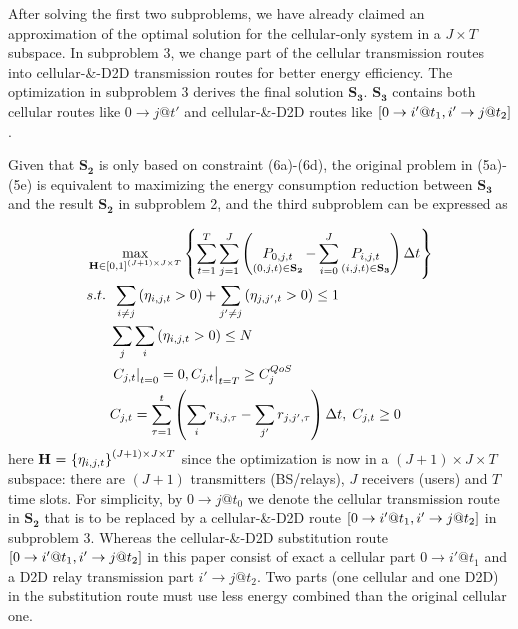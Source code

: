 \documentclass{ieeeaccess}
\begin{document}
After solving the first two subproblems, we have already claimed an approximation of the optimal solution for the cellular-only system in a $J \times T$ subspace. In subproblem 3, we change part of the cellular transmission routes into cellular-\&-D2D transmission routes for better energy efficiency. The optimization in subproblem 3 derives the final solution ${{\mathbf{S}}_{\mathbf{3}}}$. ${{\mathbf{S}}_{\mathbf{3}}}$ contains both cellular routes like $0 \to j@t'$ and cellular-\&-D2D routes like $\left[ {{\rm{0}} \to i'@{t_1},i' \to j@{t_2}} \right]$.

Given that ${{\mathbf{S}}_{\mathbf{2}}}$ is only based on constraint (6a)-(6d), the original problem in (5a)-(5e) is equivalent to maximizing the energy consumption reduction between ${{\mathbf{S}}_{\mathbf{3}}}$ and the result ${{\mathbf{S}}_{\mathbf{2}}}$ in subproblem 2, and the third subproblem can be expressed as

\begin{subequations}
\begin{align}
& \mathop {\max }\limits_{{\mathbf{{\rm H}}} \in {{\left[ {0,1} \right]}^{\left( {J + 1} \right) \times J \times T}}} \left\{ {\sum\limits_{t = 1}^T {\sum\limits_{j = 1}^J {\left( {\mathop {{P_{0,j,t}}}\limits_{\left( {0,j,t} \right) \in {{\mathbf{S}}_{\mathbf{2}}}}  - \sum\limits_{i = 0}^J {\mathop {{P_{i,j,t}}}\limits_{\left( {i,j,t} \right) \in {{\mathbf{S}}_{\mathbf{3}}}} } } \right)\Delta t} } } \right\} \\
& {s.t.} \;\; \sum\limits_{i \ne j} {\left( {{\eta _{i,j,t}} > 0} \right)}  + \sum\limits_{j' \ne j} {\left( {{\eta _{j,j',t}} > 0} \right) \le {\text{1}}} \\
& \;\;\;\;\;\; \sum\limits_j {\sum\limits_i {\left( {{\eta _{i,j,t}} > 0} \right)} }  \le N \\
& \;\;\;\;\;\; {\left. {{{\left. {{C_{j,t}}} \right|}_{t = 0}} = 0, {C_{j,t}}} \right|_{t = T}} \ge C_j^{QoS} \\
& \;\;\;\;\;\; {C_{j,t}} = \sum\limits_{\tau  = 1}^t {\left( {\sum\limits_i {{r_{i,j,\tau }}}  - \sum\limits_{j'} {{r_{j,j',\tau }}} } \right)\Delta t} ,\; {C_{j,t}} \ge 0
\end{align}
\end{subequations}
here ${\mathbf{{\rm H}}}{\text{ = }}{\left\{ {{\eta _{i,j,t}}} \right\}^{\left( {J + 1} \right) \times J \times T}}$ since the optimization is now in a $\left( {J + 1} \right) \times J \times T$ subspace: there are $\left( {J + 1} \right)$ transmitters (BS/relays), $J$ receivers (users) and $T$ time slots. For simplicity, by $0 \to j@{t_0}$ we denote the cellular transmission route in ${{\mathbf{S}}_{\mathbf{2}}}$ that is to be replaced by a cellular-\&-D2D route $\left[ {{\rm{0}} \to i'@{t_1},i' \to j@{t_2}} \right]$ in subproblem 3. Whereas the cellular-\&-D2D substitution route $\left[ {{\rm{0}} \to i'@{t_1},i' \to j@{t_2}} \right]$ in this paper consist of exact a cellular part $0 \to i'@{t_1}$ and a D2D relay transmission part $i' \to j@{t_2}$. Two parts (one cellular and one D2D) in the substitution route must use less energy combined than the original cellular one.
\end{document}
